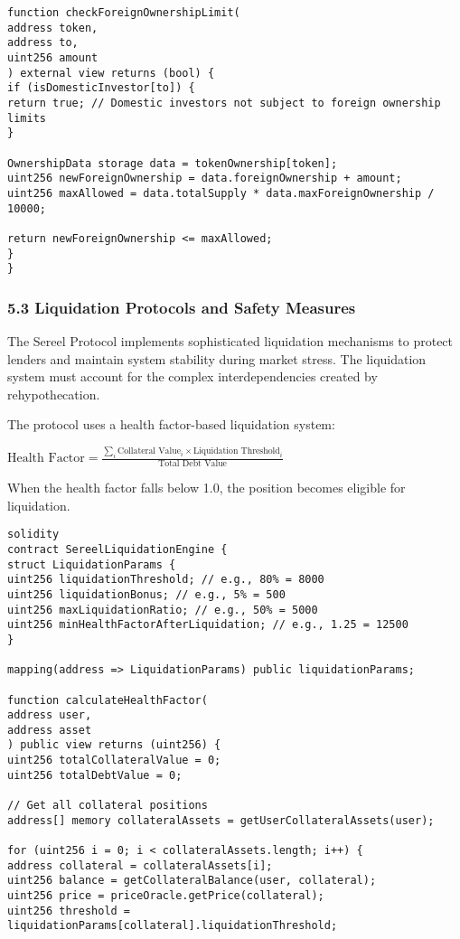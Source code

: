\documentclass[12pt]{article}
\begin{document}
{{{\begin{lstlisting}
function checkForeignOwnershipLimit(
address token,
address to,
uint256 amount
) external view returns (bool) {
if (isDomesticInvestor[to]) {
return true; // Domestic investors not subject to foreign ownership limits
}

OwnershipData storage data = tokenOwnership[token];
uint256 newForeignOwnership = data.foreignOwnership + amount;
uint256 maxAllowed = data.totalSupply * data.maxForeignOwnership / 10000;

return newForeignOwnership <= maxAllowed;
}
}
\end{lstlisting}

\subsubsection{5.3 Liquidation Protocols and Safety Measures} %

The Sereel Protocol implements sophisticated liquidation mechanisms to protect lenders and maintain system stability during market stress. The liquidation system must account for the complex interdependencies created by rehypothecation.


The protocol uses a health factor-based liquidation system:

$\text{Health Factor} = \frac{\sum_{i} \text{Collateral Value}_i \times \text{Liquidation Threshold}_i}{\text{Total Debt Value}}$

When the health factor falls below 1.0, the position becomes eligible for liquidation.


\begin{lstlisting}
solidity
contract SereelLiquidationEngine {
struct LiquidationParams {
uint256 liquidationThreshold; // e.g., 80% = 8000
uint256 liquidationBonus; // e.g., 5% = 500
uint256 maxLiquidationRatio; // e.g., 50% = 5000
uint256 minHealthFactorAfterLiquidation; // e.g., 1.25 = 12500
}

mapping(address => LiquidationParams) public liquidationParams;

function calculateHealthFactor(
address user,
address asset
) public view returns (uint256) {
uint256 totalCollateralValue = 0;
uint256 totalDebtValue = 0;

// Get all collateral positions
address[] memory collateralAssets = getUserCollateralAssets(user);

for (uint256 i = 0; i < collateralAssets.length; i++) {
address collateral = collateralAssets[i];
uint256 balance = getCollateralBalance(user, collateral);
uint256 price = priceOracle.getPrice(collateral);
uint256 threshold = liquidationParams[collateral].liquidationThreshold;


\end{lstlisting}}}}
\end{document}
